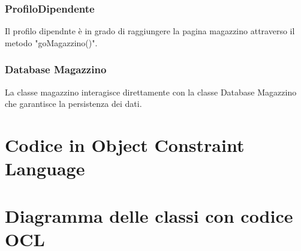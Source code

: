 \documentclass{report}
\begin{document}
\subsection*{ProfiloDipendente}

Il profilo dipendnte è in grado di raggiungere la pagina magazzino attraverso il metodo "goMagazzino()".

\subsection*{Database Magazzino}

La classe magazzino interagisce direttamente con la classe Database Magazzino che garantisce la persistenza dei dati.


\chapter{Codice in Object Constraint Language}	
	
\chapter{Diagramma delle classi con codice OCL}
	
\end{document}
